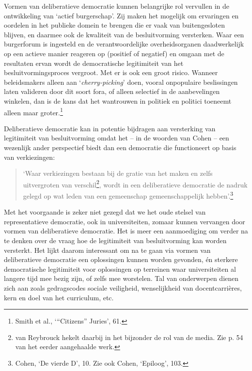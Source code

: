 \documentclass[smallauthor, chapterhaspagenum, nochapterinheader, pagenuminheader,  bigchapnum,medium2, tocpages, garamond, titleinheader]{jote-book}
\begin{document}
	Vormen van deliberatieve democratie kunnen belangrijke rol vervullen in de ontwikkeling van ‘actief burgerschap'. Zij maken het mogelijk om ervaringen en oordelen in het publieke domein te brengen die er vaak van buitengesloten blijven, en daarmee ook de kwaliteit van de besluitvorming versterken. Waar een burgerforum is ingesteld en de verantwoordelijke overheidsorganen daadwerkelijk op een actieve manier reageren op (positief of negatief) en omgaan met de resultaten ervan wordt de democratische legitimiteit van het besluitvormingsproces vergroot. Met er is ook een groot risico. Wanneer beleidsmakers alleen aan ‘\emph{cherry-picking}' doen, vooral onpopulaire beslissingen laten valideren door dit soort fora, of alleen selectief in de aanbevelingen winkelen, dan is de kans dat het wantrouwen in politiek en politici toeneemt alleen maar groter.\footnote{Smith et al., ‘“Citizens” Juries', 61.}



	Deliberatieve democratie kan in potentie bijdragen aan versterking van legitimiteit van besluitvorming omdat het -- in de woorden van Cohen -- een wezenlijk ander perspectief biedt dan een democratie die functioneert op basis van verkiezingen:

	\begin{quote}
		\itshape

		‘Waar verkiezingen bestaan bij de gratie van het maken en zelfs uitvergroten van verschil\footnote{van Reybrouck hekelt daarbij in het bijzonder de rol van de media. Zie p. 54 van het eerder aangehaalde werk.}, wordt in een deliberatieve democratie de nadruk gelegd op wat leden van een gemeenschap gemeenschappelijk hebben'.\footnote{Cohen, ‘De vierde D', 10. Zie ook Cohen, ‘Epiloog', 103.}
	\end{quote}

	Met het voorgaande is zeker niet gezegd dat we het oude stelsel van representatieve democratie, ook in universiteiten, zomaar kunnen vervangen door vormen van deliberatieve democratie. Het is meer een aanmoediging om verder na te denken over de vraag hoe de legitimiteit van besluitvorming kan worden versterkt. Het lijkt daarom interessant om na te gaan via vormen van deliberatieve democratie een oplossingen kunnen worden gevonden, én sterkere democratische legitimiteit voor oplossingen op terreinen waar universiteiten al langere tijd mee bezig zijn, of zelfs mee worstelen. Tal van onderwerpen dienen zich aan zoals gedragscodes sociale veiligheid, wenselijkheid van docentcarrières, kern en doel van het curriculum, etc.
\end{document}
